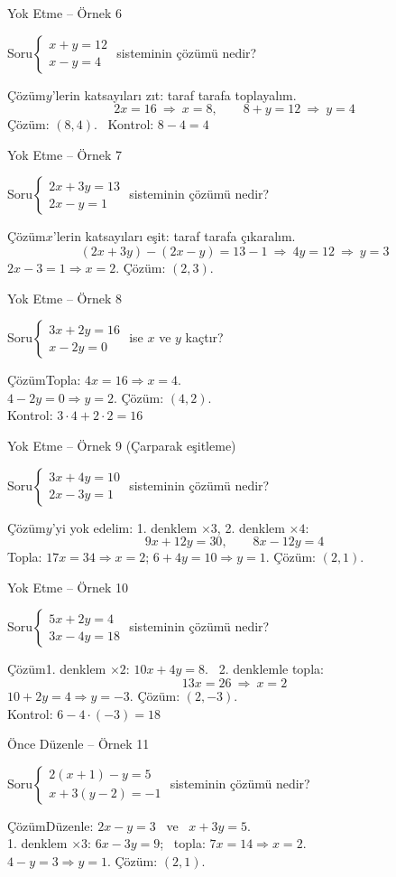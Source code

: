 \documentclass[aspectratio=169,11pt]{beamer}
\newcommand{\soru}[3]{%
\begin{frame}{#1}
  \begin{block}{Soru}\large #2\end{block}
  \pause
  \begin{exampleblock}{Çözüm}\large #3\end{exampleblock}
\end{frame}}
\begin{document}
\soru{Yok Etme -- Örnek 6}
{\(\begin{cases}x+y=12\\ x-y=4\end{cases}\) \quad sisteminin çözümü nedir?}
{\(y\)'lerin katsayıları zıt: taraf tarafa toplayalım.
\[2x=16\ \Rightarrow\ x=8,\qquad 8+y=12\ \Rightarrow\ y=4\]
Çözüm: \((8,4)\). \ Kontrol: \(8-4=4\) \checkmark}

\soru{Yok Etme -- Örnek 7}
{\(\begin{cases}2x+3y=13\\ 2x-y=1\end{cases}\) \quad sisteminin çözümü nedir?}
{\(x\)'lerin katsayıları eşit: taraf tarafa çıkaralım.
\[(2x+3y)-(2x-y)=13-1\ \Rightarrow\ 4y=12\ \Rightarrow\ y=3\]
\(2x-3=1\Rightarrow x=2\). \quad Çözüm: \((2,3)\).}

\soru{Yok Etme -- Örnek 8}
{\(\begin{cases}3x+2y=16\\ x-2y=0\end{cases}\) \quad ise \(x\) ve \(y\) kaçtır?}
{Topla: \(4x=16\Rightarrow x=4\).\\[3pt]
\(4-2y=0\Rightarrow y=2\). \quad Çözüm: \((4,2)\).\\[3pt]
Kontrol: \(3\cdot 4+2\cdot 2=16\) \checkmark}

\soru{Yok Etme -- Örnek 9 (Çarparak eşitleme)}
{\(\begin{cases}3x+4y=10\\ 2x-3y=1\end{cases}\) \quad sisteminin çözümü nedir?}
{\(y\)'yi yok edelim: 1. denklem \(\times 3\), 2. denklem \(\times 4\):
\[9x+12y=30,\qquad 8x-12y=4\]
Topla: \(17x=34\Rightarrow x=2\); \quad \(6+4y=10\Rightarrow y=1\). \quad Çözüm: \((2,1)\).}

\soru{Yok Etme -- Örnek 10}
{\(\begin{cases}5x+2y=4\\ 3x-4y=18\end{cases}\) \quad sisteminin çözümü nedir?}
{1. denklem \(\times 2\): \(10x+4y=8\). \ 2. denklemle topla:
\[13x=26\ \Rightarrow\ x=2\]
\(10+2y=4\Rightarrow y=-3\). \quad Çözüm: \((2,-3)\).\\[2pt]
Kontrol: \(6-4\cdot(-3)=18\) \checkmark}

\soru{Önce Düzenle -- Örnek 11}
{\(\begin{cases}2(x+1)-y=5\\ x+3(y-2)=-1\end{cases}\) \quad sisteminin çözümü nedir?}
{Düzenle: \(2x-y=3\) \ ve \ \(x+3y=5\).\\[3pt]
1. denklem \(\times 3\): \(6x-3y=9\); \ topla: \(7x=14\Rightarrow x=2\).\\[3pt]
\(4-y=3\Rightarrow y=1\). \quad Çözüm: \((2,1)\).}
\end{document}

